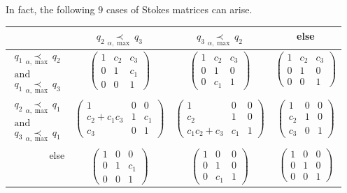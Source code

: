 In fact, the following $9$ cases of Stokes matrices can arise.
\begin{center}
  \def\arraystretch{1.3}
  \setlength\tabcolsep{4mm}
  \begin{tabular}{r|c|c|c}
    & $q_2 \underset{\alpha,\max}{\prec} q_3$
    & $q_3 \underset{\alpha,\max}{\prec} q_2$
    & else
    \tabularnewline
    \hline
    $\substack{q_1 \underset{\alpha,\max}{\prec} q_2\\\text{and}
    \\q_1 \underset{\alpha,\max}{\prec} q_3}$
    & $\begin{pmatrix} 1 & c_2 & c_3 \\0 & 1 & c_1 \\0 & 0 & 1 \end{pmatrix}$
   \cellcolor{blue!15}
    & $\begin{pmatrix} 1 & c_2 & c_3 \\0 & 1 & 0 \\0 & c_1 & 1 \end{pmatrix}$
   \cellcolor{blue!15}
    & $\begin{pmatrix} 1 & c_2 & c_3 \\0 & 1 & 0 \\0 & 0 & 1 \end{pmatrix}$
   \cellcolor{green!15}
    \tabularnewline
    \hline
    $\substack{q_2 \underset{\alpha,\max}{\prec} q_1\\\text{and}
    \\q_3 \underset{\alpha,\max}{\prec} q_1}$
    & $\begin{pmatrix} 1 & 0 & 0 \\c_2+c_1c_3 & 1 & c_1 \\c_3 & 0 & 1 \end{pmatrix}$
   \cellcolor{blue!15}
    & $\begin{pmatrix} 1 & 0 & 0 \\c_2 & 1 & 0 \\c_1c_2+c_3 & c_1 & 1 \end{pmatrix}$
   \cellcolor{blue!15}
    & $\begin{pmatrix} 1 & 0 & 0 \\c_2 & 1 & 0 \\c_3 & 0 & 1 \end{pmatrix}$
   \cellcolor{green!15}
    \tabularnewline
    \hline
    else
    & $\begin{pmatrix} 1 & 0 & 0 \\0 & 1 & c_1 \\0 & 0 & 1 \end{pmatrix}$
   \cellcolor{purple!15}
    & $\begin{pmatrix} 1 & 0 & 0 \\0 & 1 & 0 \\0 & c_1 & 1 \end{pmatrix}$
   \cellcolor{purple!15}
    & $\begin{pmatrix} 1 & 0 & 0 \\0 & 1 & 0 \\0 & 0 & 1 \end{pmatrix}$
  \end{tabular}
\end{center}
